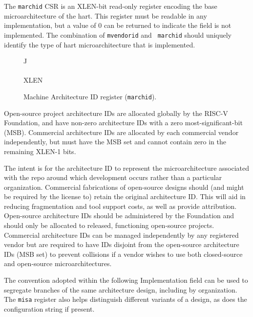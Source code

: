 The {\tt marchid} CSR is an XLEN-bit read-only register encoding the
base microarchitecture of the hart.  This register must be readable in
any implementation, but a value of 0 can be returned to indicate the
field is not implemented.  The combination of {\tt mvendorid} and {\tt
  marchid} should uniquely identify the type of hart microarchitecture
that is implemented.

\begin{figure*}[h!]
{\footnotesize
\begin{center}
\begin{tabular}{J}
 \\
\hline
{} \\
\hline
XLEN \\
\end{tabular}
\end{center}
}
\vspace{-0.1in}
\caption{Machine Architecture ID register ({\tt marchid}).}
\label{marchreg}
\end{figure*}

Open-source project architecture IDs are allocated globally by the
RISC-V Foundation, and have non-zero architecture IDs with a zero
most-significant-bit (MSB).  Commercial architecture IDs are allocated
by each commercial vendor independently, but must have the MSB set and
cannot contain zero in the remaining XLEN-1 bits.

\begin{commentary}
The intent is for the architecture ID to represent the
microarchitecture associated with the repo around which development
occurs rather than a particular organization.  Commercial fabrications
of open-source designs should (and might be required by the license
to) retain the original architecture ID.  This will aid in reducing
fragmentation and tool support costs, as well as provide attribution.
Open-source architecture IDs should be administered by the Foundation
and should only be allocated to released, functioning open-source
projects.  Commercial architecture IDs can be managed independently by
any registered vendor but are required to have IDs disjoint from the
open-source architecture IDs (MSB set) to prevent collisions if a
vendor wishes to use both closed-source and open-source
microarchitectures.

The convention adopted within the following Implementation field can
be used to segregate branches of the same architecture design,
including by organization.  The {\tt misa} register also helps
distinguish different variants of a design, as does the configuration
string if present.
\end{commentary}

